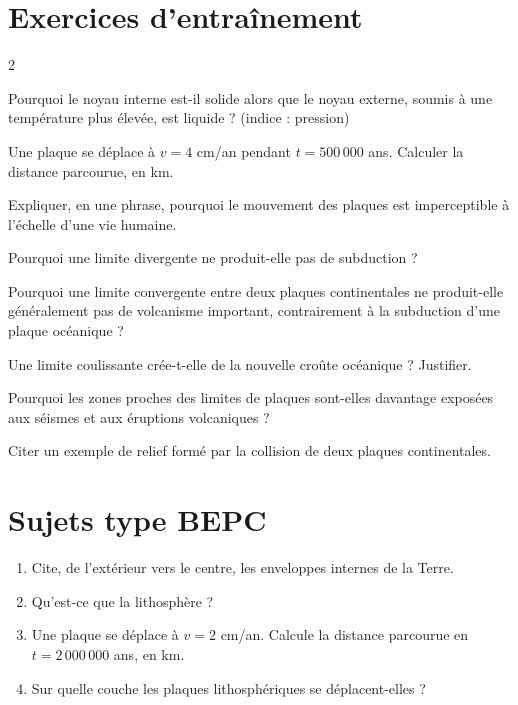 \section{Exercices d'entraînement}
\begin{multicols}{2}

\exo{} Pourquoi le noyau interne est-il solide alors que le noyau externe,
soumis à une température plus élevée, est liquide ? (indice : pression)

\exo{} Une plaque se déplace à $v=4$ cm/an pendant $t=500\,000$ ans. Calculer
la distance parcourue, en km.

\exo{} Expliquer, en une phrase, pourquoi le mouvement des plaques est
imperceptible à l'échelle d'une vie humaine.

\exo{} Pourquoi une limite divergente ne produit-elle pas de subduction ?

\exo{} Pourquoi une limite convergente entre deux plaques continentales ne
produit-elle généralement pas de volcanisme important, contrairement à la subduction
d'une plaque océanique ?

\exo{} Une limite coulissante crée-t-elle de la nouvelle croûte océanique ?
Justifier.

\exo{} Pourquoi les zones proches des limites de plaques sont-elles davantage
exposées aux séismes et aux éruptions volcaniques ?

\exo{} Citer un exemple de relief formé par la collision de deux plaques
continentales.

\end{multicols}

\section{Sujets type BEPC}

\begin{enumerate}[label=\arabic*)]
\item Cite, de l'extérieur vers le centre, les enveloppes internes de la Terre.
\item Qu'est-ce que la lithosphère ?
\item Une plaque se déplace à $v=2$ cm/an. Calcule la distance parcourue en
$t=2\,000\,000$ ans, en km.
\item Sur quelle couche les plaques lithosphériques se déplacent-elles ?
\end{enumerate}

